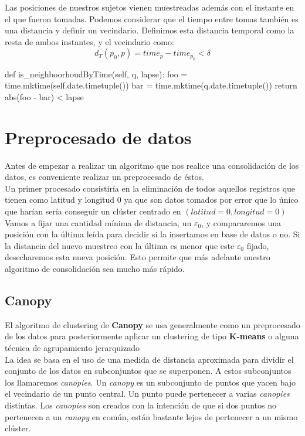 \documentclass[a4paper, 12pt]{article}
\begin{document}
Las posiciones de nuestros sujetos vienen muestreadas adem\'as con el instante en el que fueron tomadas. Podemos considerar que el tiempo entre tomas tambi\'en es una distancia y definir un vecindario. Definimos esta distancia temporal como la resta de ambos instantes, y el vecindario como: \\

$$ d_T(p_0, p) = time_p - time_{p_0} < \delta $$

\begin{python}
	def is_neighboorhoudByTime(self, q, lapse):
		foo = time.mktime(self.date.timetuple())
		bar = time.mktime(q.date.timetuple())
		return abs(foo - bar) < lapse
\end{python}


\pagebreak
\section{Preprocesado de datos}
Antes de empezar a realizar un algoritmo que nos realice una consolidaci\'on de los datos, es conveniente realizar un preprocesado de \'estos. \\

Un primer procesado consistir\'ia en la eliminaci\'on de todos aquellos registros que tienen como latitud y longitud $0$ ya que son datos tomados por error que lo \'unico que har\'ian ser\'ia conseguir un cl\'uster centrado en $(latitud = 0, longitud = 0)$ \\

Vamos a fijar una cantidad m\'inima de distancia, un $\varepsilon_0$, y compararemos una posici\'on con la \'ultima le\'ida para decidir si la insertamos en base de datos o no. Si la distancia del nuevo muestreo con la \'ultima es menor que este $\varepsilon_0$ fijado, desecharemos esta nueva posici\'on. Esto permite que m\'as adelante nuestro algoritmo de consolidaci\'on sea mucho m\'as r\'apido. \\


\subsection{Canopy}\label{sec:canopy}

El algoritmo de clustering de \textbf{Canopy} se usa generalmente como un preprocesado de los datos para posteriormente aplicar un clustering de tipo \textbf{K-means} o alguna t\'ecnica de agrupamiento jerarquizado\\

La idea se basa en el uso de una medida de distancia aproximada para dividir el conjunto de los datos en subconjuntos que se superponen. A estos subconjuntos los llamaremos \textit{canopies}. Un \textit{canopy} es un subconjunto de puntos que yacen bajo el vecindario de un punto central. Un punto puede pertenecer a varias \textit{canopies} distintas. Los \textit{canopies} son creados con la intenci\'on de que si dos puntos no pertenecen a un \textit{canopy} en com\'un, est\'an bastante lejos de pertenecer a un mismo cl\'uster. \\
\end{document}
